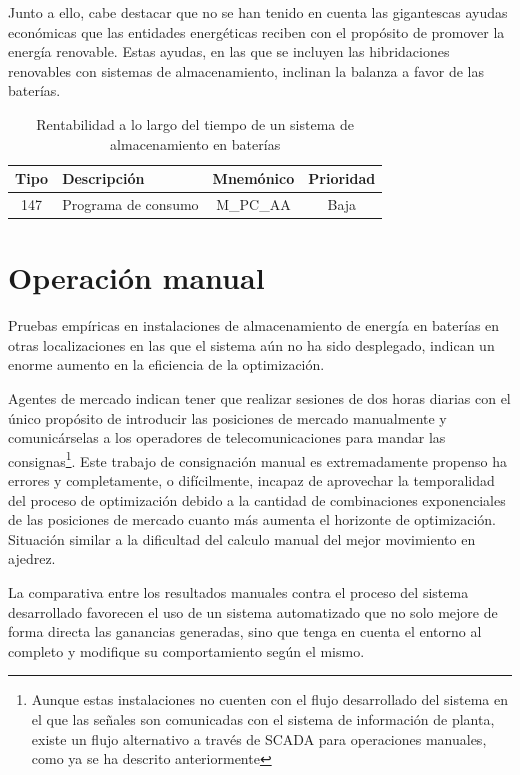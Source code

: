 Junto a ello, cabe destacar que no se han tenido en cuenta las gigantescas ayudas económicas que las entidades energéticas reciben con el propósito de promover la energía renovable. Estas ayudas, en las que se incluyen las hibridaciones renovables con sistemas de almacenamiento, inclinan la balanza a favor de las baterías.

\begin{table}[ht]
  \centering
  \begin{tabular}{|c|p{7.5cm}|c|c|}
    \hline
    Tipo & Descripción         & Mnemónico & Prioridad\\
    \hline
    147  & Programa de consumo & M\_PC\_AA & Baja     \\
    \hline
  \end{tabular}
  \caption{Rentabilidad a lo largo del tiempo de un sistema de almacenamiento en baterías}
  \label{tab:rentabilidad-bess}
\end{table}

\section{Operación manual}
\label{makereference7.2}

Pruebas empíricas en instalaciones de almacenamiento de energía en baterías en otras localizaciones en las que el sistema aún no ha sido desplegado, indican un enorme aumento en la eficiencia de la optimización.

Agentes de mercado indican tener que realizar sesiones de dos horas diarias con el único propósito de introducir las posiciones de mercado manualmente y comunicárselas a los operadores de telecomunicaciones para mandar las consignas\footnote{Aunque estas instalaciones no cuenten con el flujo desarrollado del sistema en el que las señales son comunicadas con el sistema de información de planta, existe un flujo alternativo a través de SCADA para operaciones manuales, como ya se ha descrito anteriormente}. Este trabajo de consignación manual es extremadamente propenso ha errores y completamente, o difícilmente, incapaz de aprovechar la temporalidad del proceso de optimización debido a la cantidad de combinaciones exponenciales de las posiciones de mercado cuanto más aumenta el horizonte de optimización. Situación similar a la dificultad del calculo manual del mejor movimiento en ajedrez.

La comparativa entre los resultados manuales contra el proceso del sistema desarrollado favorecen el uso de un sistema automatizado que no solo mejore de forma directa las ganancias generadas, sino que tenga en cuenta el entorno al completo y modifique su comportamiento según el mismo.

